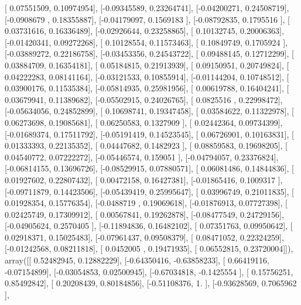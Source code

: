 \documentclass{article}
\begin{document}
       [ 0.07551509,  0.10974954],
       [-0.09345589,  0.23264741],
       [-0.04200271,  0.24508719],
       [-0.0908679 ,  0.18355887],
       [-0.04179097,  0.1569183 ],
       [-0.08792835,  0.1795516 ],
       [ 0.03731616,  0.16336489],
       [-0.02926644,  0.23258865],
       [ 0.10132745,  0.20006363],
       [-0.01420341,  0.09272268],
       [ 0.10128554,  0.11573463],
       [ 0.10849749,  0.1705924 ],
       [-0.03889272,  0.22186758],
       [-0.03453356,  0.24543722],
       [ 0.09488145,  0.12712299],
       [ 0.03884709,  0.16354181],
       [ 0.05184815,  0.21913939],
       [ 0.09150951,  0.20749824],
       [ 0.04222283,  0.08141164],
       [-0.03121533,  0.10855914],
       [-0.01144204,  0.10748512],
       [ 0.03900176,  0.11535384],
       [-0.05814935,  0.25981956],
       [ 0.00619788,  0.16404241],
       [ 0.03679941,  0.11389682],
       [-0.05502915,  0.24026765],
       [ 0.0825516 ,  0.22998472],
       [-0.05634056,  0.24852899],
       [ 0.10698741,  0.19347458],
       [ 0.03584622,  0.11322978],
       [ 0.06273698,  0.19085681],
       [ 0.06250583,  0.1327909 ],
       [ 0.02442364,  0.09734399],
       [-0.01689374,  0.17511792],
       [-0.05191419,  0.14523545],
       [ 0.06726901,  0.10163831],
       [ 0.01333393,  0.22135352],
       [ 0.04447682,  0.1482923 ],
       [ 0.08859583,  0.19698205],
       [ 0.04540772,  0.07222272],
       [-0.05446574,  0.159051  ],
       [-0.04794057,  0.23376824],
       [-0.06814155,  0.13696726],
       [-0.08529915,  0.07880571],
       [ 0.06081486,  0.14844836],
       [ 0.01927602,  0.22807432],
       [ 0.00472158,  0.16427381],
       [-0.01865416,  0.1009317 ],
       [-0.09711879,  0.14423506],
       [-0.05439419,  0.25995647],
       [ 0.03996749,  0.21011835],
       [ 0.01928354,  0.15776354],
       [-0.0488719 ,  0.19069618],
       [-0.01876913,  0.07727398],
       [ 0.02425749,  0.17309912],
       [ 0.00567841,  0.19262878],
       [-0.08477549,  0.24729156],
       [-0.04905624,  0.2570405 ],
       [-0.11894836,  0.16482102],
       [ 0.07351763,  0.09950642],
       [ 0.02918371,  0.15025483],
       [-0.07961437,  0.09508379],
       [ 0.08471052,  0.22324259],
       [-0.01242568,  0.08211818],
       [ 0.0452005 ,  0.19471935],
       [ 0.06552815,  0.23720004]]), array([[ 0.52482945,  0.12882229],
       [-0.64350416, -0.63858233],
       [ 0.66419116, -0.07154899],
       [-0.03054853,  0.02500945],
       [-0.67034818, -0.1425554 ],
       [ 0.15756251,  0.85492842],
       [ 0.20208439,  0.80184856],
       [-0.51108376,  1.        ],
       [-0.93628569,  0.7065962 ],
\end{document}
